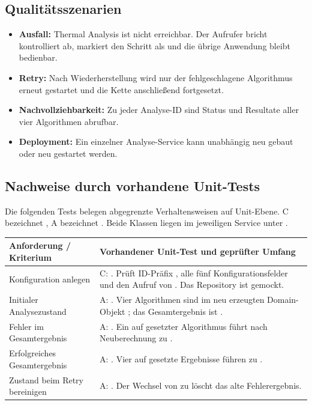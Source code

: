 \subsection{Qualitätsszenarien}
\begin{itemize}
  \item \textbf{Ausfall:} Thermal Analysis ist nicht erreichbar. Der Aufrufer bricht kontrolliert ab, markiert den Schritt als  und die übrige Anwendung bleibt bedienbar.
  \item \textbf{Retry:} Nach Wiederherstellung wird nur der fehlgeschlagene Algorithmus erneut gestartet und die Kette anschlie\ss{}end fortgesetzt.
  \item \textbf{Nachvollziehbarkeit:} Zu jeder Analyse-ID sind Status und Resultate aller vier Algorithmen abrufbar.
  \item \textbf{Deployment:} Ein einzelner Analyse-Service kann unabhängig neu gebaut oder neu gestartet werden.
\end{itemize}


\subsection{Nachweise durch vorhandene Unit-Tests}
Die folgenden Tests belegen abgegrenzte Verhaltensweisen auf Unit-Ebene. C bezeichnet
, A bezeichnet .
Beide Klassen liegen im jeweiligen Service unter .

\begin{tabularx}{\textwidth}{L{4.1cm}Y}
\toprule
\textbf{Anforderung / Kriterium} & \textbf{Vorhandener Unit-Test und geprüfter Umfang} \\
\midrule
Konfiguration anlegen & C: . Prüft ID-Präfix , alle fünf Konfigurationsfelder und den Aufruf von . Das Repository ist gemockt. \\
Initialer Analysezustand & A: . Vier Algorithmen sind im neu erzeugten Domain-Objekt ; das Gesamtergebnis ist . \\
Fehler im Gesamtergebnis & A: . Ein auf  gesetzter Algorithmus führt nach Neuberechnung zu . \\
Erfolgreiches Gesamtergebnis & A: . Vier auf  gesetzte Ergebnisse führen zu . \\
Zustand beim Retry bereinigen & A: . Der Wechsel von  zu  löscht das alte Fehlerergebnis. \\
\bottomrule
\end{tabularx}

